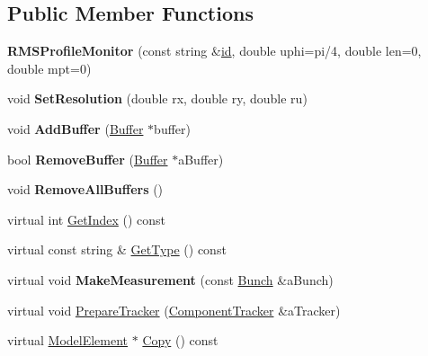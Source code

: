 \subsection*{Public Member Functions}
\begin{DoxyCompactItemize}
\item 
\mbox{\label{classRMSProfileMonitor_ae31bf988119409343ebc8977d4b0f023}} 
{\bfseries R\+M\+S\+Profile\+Monitor} (const string \&\hyperlink{classModelElement_aada171ead2085c75b592cf07d91bc5c2}{id}, double uphi=pi/4, double len=0, double mpt=0)
\item 
\mbox{\label{classRMSProfileMonitor_a167832c5f9034757f9fcd4cd78f070c9}} 
void {\bfseries Set\+Resolution} (double rx, double ry, double ru)
\item 
\mbox{\label{classRMSProfileMonitor_a917c3008635dae5de84c7dfdd23e0644}} 
void {\bfseries Add\+Buffer} (\hyperlink{classRMSProfileMonitor_1_1Buffer}{Buffer} $\ast$buffer)
\item 
\mbox{\label{classRMSProfileMonitor_a56ffbde9de1137720dc396c802e6a57a}} 
bool {\bfseries Remove\+Buffer} (\hyperlink{classRMSProfileMonitor_1_1Buffer}{Buffer} $\ast$a\+Buffer)
\item 
\mbox{\label{classRMSProfileMonitor_a747da262f68701f971dab0ce55c95add}} 
void {\bfseries Remove\+All\+Buffers} ()
\item 
virtual int \hyperlink{classRMSProfileMonitor_a87a98fa994d96c393a91500320242942}{Get\+Index} () const
\item 
virtual const string \& \hyperlink{classRMSProfileMonitor_ab97d742126deccadd878c402291a6263}{Get\+Type} () const
\item 
\mbox{\label{classRMSProfileMonitor_a2ebfded9365f9422d37f5619b30be94e}} 
virtual void {\bfseries Make\+Measurement} (const \hyperlink{classBunch}{Bunch} \&a\+Bunch)
\item 
virtual void \hyperlink{classRMSProfileMonitor_ae5c6ecda857727f6ac78da99b08c88c1}{Prepare\+Tracker} (\hyperlink{classComponentTracker}{Component\+Tracker} \&a\+Tracker)
\item 
virtual \hyperlink{classModelElement}{Model\+Element} $\ast$ \hyperlink{classRMSProfileMonitor_a44abc9eaa3a638c8fffadc81a3728b6e}{Copy} () const
\end{DoxyCompactItemize}
